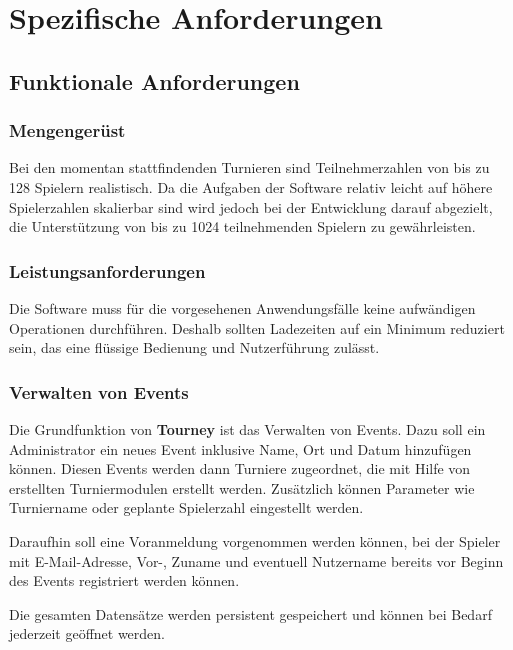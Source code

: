 \documentclass[11pt]{article}
\begin{document}
\newpage

\section{Spezifische Anforderungen}

\subsection{Funktionale Anforderungen}

\subsubsection{Mengengerüst}

Bei den momentan stattfindenden Turnieren sind Teilnehmerzahlen von bis zu 128 Spielern realistisch. Da die Aufgaben der Software relativ leicht auf höhere Spielerzahlen skalierbar sind wird jedoch bei der Entwicklung darauf abgezielt, die Unterstützung von bis zu 1024 teilnehmenden Spielern zu gewährleisten.

\subsubsection{Leistungsanforderungen}

Die Software muss für die vorgesehenen Anwendungsfälle keine aufwändigen Operationen durchführen. Deshalb sollten Ladezeiten auf ein Minimum reduziert sein, das eine flüssige Bedienung und Nutzerführung zulässt.

\subsubsection{Verwalten von Events}

Die Grundfunktion von \textbf{Tourney} ist das Verwalten von Events. Dazu soll ein Administrator ein neues Event inklusive Name, Ort und Datum hinzufügen können. Diesen Events werden dann Turniere zugeordnet, die mit Hilfe von erstellten Turniermodulen erstellt werden. Zusätzlich können Parameter wie Turniername oder geplante Spielerzahl eingestellt werden.

Daraufhin soll eine Voranmeldung vorgenommen werden können, bei der Spieler mit E-Mail-Adresse, Vor-, Zuname und eventuell Nutzername bereits vor Beginn des Events registriert werden können.

Die gesamten Datensätze werden persistent gespeichert und können bei Bedarf jederzeit geöffnet werden.
\end{document}
